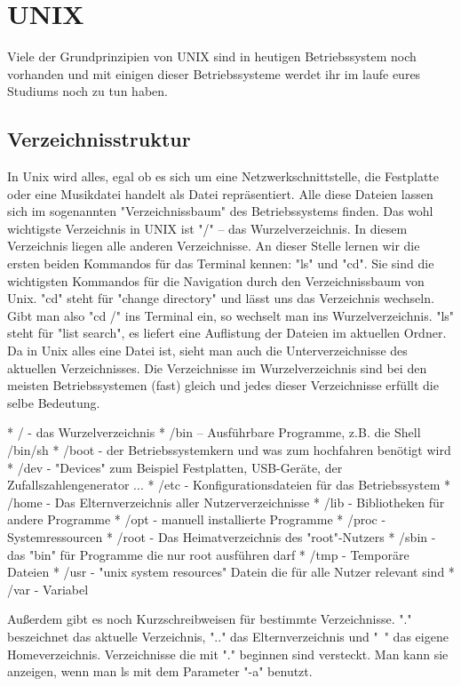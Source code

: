 \chapter{UNIX}

Viele der Grundprinzipien von UNIX sind in heutigen Betriebssystem noch vorhanden und mit einigen dieser Betriebssysteme werdet ihr im laufe eures Studiums noch zu tun haben.

\section{Verzeichnisstruktur}
In Unix wird alles, egal ob es sich um eine Netzwerkschnittstelle, die Festplatte oder eine Musikdatei handelt als Datei repräsentiert. Alle diese Dateien lassen sich im sogenannten "Verzeichnissbaum" des Betriebssystems finden. Das wohl wichtigste Verzeichnis in UNIX ist "/" – das Wurzelverzeichnis. In diesem Verzeichnis liegen alle anderen Verzeichnisse.
An dieser Stelle lernen wir die ersten beiden Kommandos für das Terminal kennen: "ls" und "cd". Sie sind die wichtigsten Kommandos für die Navigation durch den Verzeichnissbaum von Unix. "cd" steht für "change directory" und lässt uns das Verzeichnis wechseln. Gibt man also "cd /" ins Terminal ein, so wechselt man ins Wurzelverzeichnis. "ls" steht für "list search", es liefert eine Auflistung der Dateien im aktuellen Ordner.
Da in Unix alles eine Datei ist, sieht man auch die Unterverzeichnisse des aktuellen Verzeichnisses.
Die Verzeichnisse im Wurzelverzeichnis sind bei den meisten Betriebssystemen (fast) gleich und jedes dieser Verzeichnisse erfüllt die selbe Bedeutung.

* / - das Wurzelverzeichnis
* /bin – Ausführbare Programme, z.B. die Shell /bin/sh 
* /boot - der Betriebssystemkern und was zum hochfahren benötigt wird
* /dev - "Devices" zum Beispiel Festplatten, USB-Geräte, der Zufallszahlengenerator ...
* /etc - Konfigurationsdateien für das Betriebssystem 
* /home - Das Elternverzeichnis aller Nutzerverzeichnisse
* /lib - Bibliotheken für andere Programme
* /opt - manuell installierte Programme
* /proc - Systemressourcen
* /root - Das Heimatverzeichnis des "root"-Nutzers
* /sbin - das "bin" für Programme die nur root ausführen darf
* /tmp - Temporäre Dateien
* /usr - "unix system resources" Datein die für alle Nutzer relevant sind
* /var - Variabel

Außerdem gibt es noch Kurzschreibweisen für bestimmte Verzeichnisse. "." beszeichnet das aktuelle Verzeichnis, ".." das Elternverzeichnis und "~" das eigene Homeverzeichnis.
Verzeichnisse die mit "." beginnen sind versteckt. Man kann sie anzeigen, wenn man ls mit dem Parameter "-a" benutzt.

